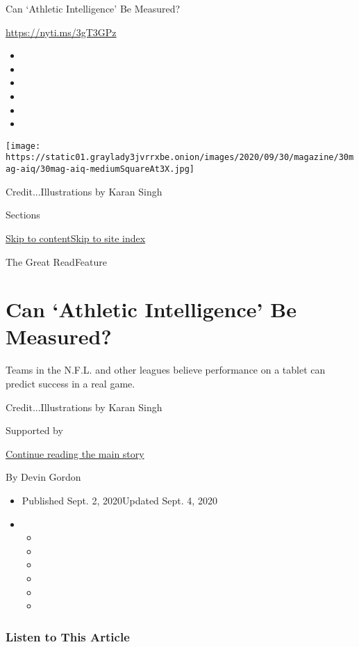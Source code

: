 Can `Athletic Intelligence' Be Measured?

\url{https://nyti.ms/3gT3GPz}

\begin{itemize}
\item
\item
\item
\item
\item
\item
\end{itemize}

\texttt{[image: https://static01.graylady3jvrrxbe.onion/images/2020/09/30/magazine/30mag-aiq/30mag-aiq-mediumSquareAt3X.jpg]}

Credit...Illustrations by Karan Singh

Sections

\protect\hyperlink{site-content}{Skip to
content}\protect\hyperlink{site-index}{Skip to site index}

The Great ReadFeature

\hypertarget{can-athletic-intelligence-be-measured}{%
\section{Can `Athletic Intelligence' Be
Measured?}\label{can-athletic-intelligence-be-measured}}

Teams in the N.F.L. and other leagues believe performance on a tablet
can predict success in a real game.

Credit...Illustrations by Karan Singh

Supported by

\protect\hyperlink{after-sponsor}{Continue reading the main story}

By Devin Gordon

\begin{itemize}
\item
  Published Sept. 2, 2020Updated Sept. 4, 2020
\item
  \begin{itemize}
  \item
  \item
  \item
  \item
  \item
  \item
  \end{itemize}
\end{itemize}

\hypertarget{listen-to-this-article}{%
\subsubsection{Listen to This Article}\label{listen-to-this-article}}


